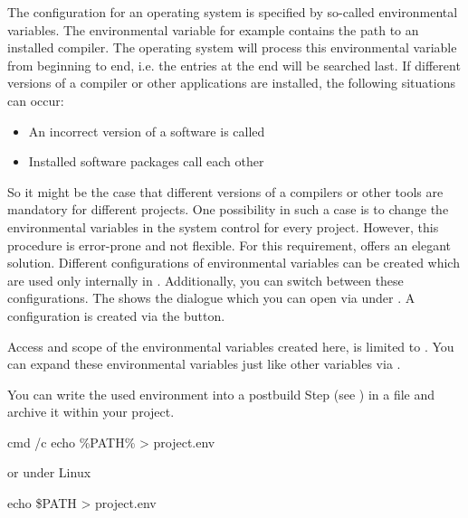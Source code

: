 The configuration for an operating system is specified by so-called environmental variables. The environmental variable  for example contains the path to an installed compiler. The operating system will process this environmental variable from beginning to end, i.e. the entries at the end will be searched last. If different versions of a compiler or other applications are installed, the following situations can occur:

\begin{itemize}
\item An incorrect version of a software is called
\item Installed software packages call each other
\end{itemize}

So it might be the case that different versions of a compilers or other tools are mandatory for different projects. One possibility in such a case is to change the environmental variables in the system control for every project. However, this procedure is error-prone and not flexible. For this requirement, \codeblocks offers an elegant solution. Different configurations of environmental variables can be created which are used only internally in \codeblocks. Additionally, you can switch between these configurations. The  shows the dialogue which you can open via  under . A configuration is created via the  button.


Access and scope of the environmental variables created here, is limited to \codeblocks. You can expand these environmental variables just like other \codeblocks variables via .



You can write the used environment into a postbuild Step (see ) in a file  and archive it within your project.

\begin{cmd}
cmd /c echo \%PATH\%  > project.env
\end{cmd}

or under Linux

\begin{cmd}
echo \$PATH > project.env
\end{cmd}

